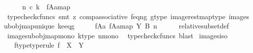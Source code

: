 \begin{isabellebody}
\isanewline
\ \ \isamarkupfalse%
\ \isamarkupfalse%
\ {\isachardoublequoteopen}n\ {\isasymcirc}\isactrlsub c\ k\ {\isacharequal}{\kern0pt}\ {\isacharbrackleft}{\kern0pt}f{\isasymlparr}A{\isasymrparr}\isactrlbsub a\isactrlesub {\isacharbrackright}{\kern0pt}map{\isachardoublequoteclose}\isanewline
\ \ \ \ \isamarkupfalse%
\ {\isacharparenleft}{\kern0pt}typecheck{\isacharunderscore}{\kern0pt}cfuncs{\isacharcomma}{\kern0pt}\ smt\ {\isacharparenleft}{\kern0pt}z{}{\isacharparenright}{\kern0pt}\ comp{\isacharunderscore}{\kern0pt}associative{}\ f{\isacharunderscore}{\kern0pt}eq{\isacharunderscore}{\kern0pt}ng\ g{\isacharunderscore}{\kern0pt}type\ image{\isacharunderscore}{\kern0pt}rest{\isacharunderscore}{\kern0pt}map{\isacharunderscore}{\kern0pt}type\ image{\isacharunderscore}{\kern0pt}subobj{\isacharunderscore}{\kern0pt}map{\isacharunderscore}{\kern0pt}unique\ k{\isacharunderscore}{\kern0pt}e{\isacharunderscore}{\kern0pt}eq{\isacharunderscore}{\kern0pt}g{\isacharparenright}{\kern0pt}\isanewline
\ \ \isamarkupfalse%
\ \isamarkupfalse%
\ {\isachardoublequoteopen}{\isacharparenleft}{\kern0pt}f{\isasymlparr}A{\isasymrparr}\isactrlbsub a\isactrlesub {\isacharcomma}{\kern0pt}\ {\isacharbrackleft}{\kern0pt}f{\isasymlparr}A{\isasymrparr}\isactrlbsub a\isactrlesub {\isacharbrackright}{\kern0pt}map{\isacharparenright}{\kern0pt}\ {\isasymsubseteq}\isactrlbsub Y\isactrlesub \ {\isacharparenleft}{\kern0pt}B{\isacharcomma}{\kern0pt}\ n{\isacharparenright}{\kern0pt}{\isachardoublequoteclose}\isanewline
\ \ \ \ \isamarkupfalse%
\ relative{\isacharunderscore}{\kern0pt}subset{\isacharunderscore}{\kern0pt}def{}\isanewline
\ \ \ \ \isamarkupfalse%
\ image{\isacharunderscore}{\kern0pt}subobj{\isacharunderscore}{\kern0pt}map{\isacharunderscore}{\kern0pt}mono\ k{\isacharunderscore}{\kern0pt}type\ n{\isacharunderscore}{\kern0pt}mono\ \isamarkupfalse%
\ {\isacharparenleft}{\kern0pt}typecheck{\isacharunderscore}{\kern0pt}cfuncs{\isacharcomma}{\kern0pt}\ blast{\isacharparenright}{\kern0pt}\isanewline
{}\isamarkupfalse%
%
\endisatagproof
{\isafoldproof}%
%
\isadelimproof
\isanewline
%
\endisadelimproof
\isanewline
{}\isamarkupfalse%
\ images{\isacharunderscore}{\kern0pt}iso{\isacharcolon}{\kern0pt}\isanewline
\ \ \ f{\isacharunderscore}{\kern0pt}type{\isacharbrackleft}{\kern0pt}type{\isacharunderscore}{\kern0pt}rule{\isacharbrackright}{\kern0pt}{\isacharcolon}{\kern0pt}\ {\isachardoublequoteopen}f\ {\isacharcolon}{\kern0pt}\ X\ {\isasymrightarrow}\ Y{\isachardoublequoteclose}\isanewline

\end{isabellebody}
